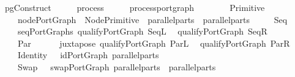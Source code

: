 \ pgConstruct\ {\isacharcolon}{\isacharcolon}\ {\isachardoublequoteopen}{\isacharparenleft}\ \ \ \ process\ {\isasymRightarrow}\ {\isacharparenleft}\ \ \ \ process{\isacharunderscore}port{\isacharunderscore}graph{\isachardoublequoteclose}\isanewline
\ \ \isanewline
\ \ \ \ {\isachardoublequoteopen}\ {\isacharparenleft}Primitive\ \ {\isacharequal}\isanewline
\ \ \ \ nodePortGraph\ {\isacharbrackleft}{\isacharbrackright}\ {\isacharparenleft}NodePrimitive\ \ {\isacharparenleft}parallel{\isacharunderscore}parts\ \ {\isacharparenleft}parallel{\isacharunderscore}parts\ \isanewline
\ \ {\isacharbar}\ {\isachardoublequoteopen}\ {\isacharparenleft}Seq\ \ {\isacharequal}\isanewline
\ \ \ \ seqPortGraphs\ {\isacharparenleft}qualifyPortGraph\ SeqL\ {\isacharparenleft}\ \isanewline
{}qualifyPortGraph\ SeqR\ {\isacharparenleft}\ \isanewline
\ \ {\isacharbar}\ {\isachardoublequoteopen}\ {\isacharparenleft}Par\ \ {\isacharequal}\isanewline
\ \ \ \ juxtapose\ {\isacharparenleft}qualifyPortGraph\ ParL\ {\isacharparenleft}\ \isanewline
{}qualifyPortGraph\ ParR\ {\isacharparenleft}\ \isanewline
\ \ {\isacharbar}\ {\isachardoublequoteopen}\ {\isacharparenleft}Identity\ \ {\isacharequal}\ idPortGraph\ {\isacharparenleft}parallel{\isacharunderscore}parts\ \isanewline
\ \ {\isacharbar}\ {\isachardoublequoteopen}\ {\isacharparenleft}Swap\ \ {\isacharequal}\ swapPortGraph\ {\isacharparenleft}parallel{\isacharunderscore}parts\ \ {\isacharparenleft}parallel{\isacharunderscore}parts\ \isanewline
